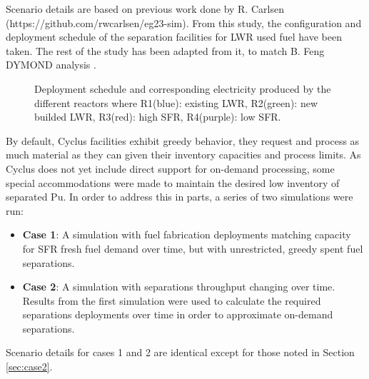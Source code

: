 \documentclass[12pt]{article}
\begin{document}
Scenario details are based on previous work done by R. Carlsen
(https://github.com/rwcarlsen/eg23-sim).  From this study, the configuration
and deployment schedule of the separation facilities for LWR used fuel have
been taken. The rest of the study has been adapted from it, to match B. Feng
DYMOND analysis \cite{B.Feng_calculation}.



\begin{figure}[h!]
    \centering
    \caption{
        Deployment schedule and corresponding electricity produced by the
        different reactors where R1(blue): existing LWR, R2(green): new
        builded LWR, R3(red): high SFR, R4(purple): low
        SFR.\label{fig:deployment}
    }
\end{figure}

By default, Cyclus facilities exhibit greedy behavior, they request and
process as much material as they can given their inventory capacities and
process limits. As Cyclus does not yet include direct support for on-demand
processing, some special accommodations were made to maintain the desired low
inventory of separated Pu. In order to address this in parts, a series of two
simulations were run:

\begin{itemize}

    \item \textbf{Case 1}: A simulation with fuel fabrication deployments
        matching capacity for SFR fresh fuel demand over time, but with
        unrestricted, greedy spent fuel separations.

    \item \textbf{Case 2}: A simulation with separations throughput changing
        over time. Results from the first simulation were used to calculate
        the required separations deployments over time in order to approximate
        on-demand separations.

\end{itemize}

Scenario details for cases 1 and 2 are identical except for those noted in
Section \ref{sec:case2}.
\end{document}
